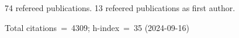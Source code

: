 74 refereed publications. 13 refeered publications as first author.

Total citations~=~4309; h-index~=~35 (2024-09-16)